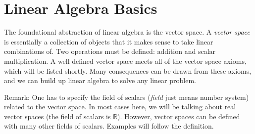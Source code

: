 \chapter{Linear Algebra Basics}

\setcounter{exercisecounter}{0}

\setcounter{thmcounter}{1}
    The foundational abstraction of linear algebra is the vector space. A \textit{vector space} is essentially a collection of objects that it
makes sense to take linear combinations of. Two operations must be defined: addition and scalar multiplication. A well defined
vector space meets all of the vector space axioms, which will be listed shortly. Many consequences can be drawn from these axioms,
and we can build up linear algebra to solve any linear problem.

Remark: One has to specify the field of scalars (\textit{field} just means number system) related to the vector space. In most cases
here, we will be talking about real vector spaces (the field of scalars is $\mathbb{R}$). However, vector spaces can be defined with
many other fields of scalars. Examples will follow the definition.
\iffalse
